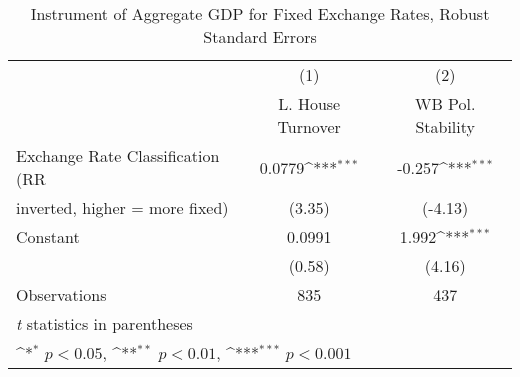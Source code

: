 \begin{table}[htbp]\centering
\def\sym#1{\ifmmode^{#1}\else\(^{#1}\)\fi}
\caption{Instrument of Aggregate GDP for Fixed Exchange Rates, Robust Standard Errors \label{miniRRIVs}}
\begin{tabular}{l*{2}{c}}
\toprule
                                        &\multicolumn{1}{c}{(1)}&\multicolumn{1}{c}{(2)}\\
                                        &\multicolumn{1}{c}{L. House Turnover}&\multicolumn{1}{c}{WB Pol. Stability}\\
\midrule
Exchange Rate Classification (RR        &   0.0779\sym{***}&   -0.257\sym{***}\\
inverted, higher = more fixed)          &   (3.35)         &  (-4.13)         \\
\addlinespace
Constant                                &   0.0991         &    1.992\sym{***}\\
                                        &   (0.58)         &   (4.16)         \\
\midrule
Observations                            &      835         &      437         \\
\bottomrule
\multicolumn{3}{l}{\footnotesize \textit{t} statistics in parentheses}\\
\multicolumn{3}{l}{\footnotesize \sym{*} \(p<0.05\), \sym{**} \(p<0.01\), \sym{***} \(p<0.001\)}\\
\end{tabular}
\end{table}
